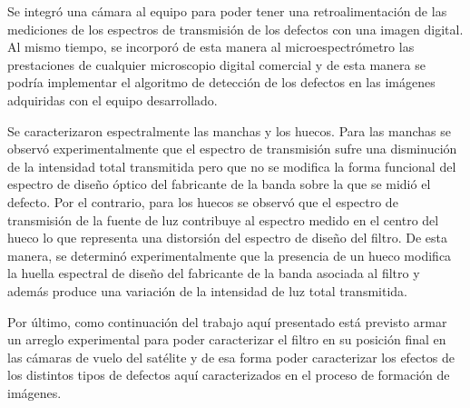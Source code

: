 Se integró una cámara al equipo para poder tener una retroalimentación de las mediciones de los espectros de transmisión de los defectos con una imagen digital. Al mismo tiempo, se incorporó de esta manera al microespectrómetro las prestaciones de cualquier microscopio digital comercial y de esta manera se podría implementar el algoritmo de detección de los defectos en las imágenes adquiridas con el equipo desarrollado.

Se caracterizaron espectralmente las manchas y los huecos. Para las manchas se observó experimentalmente que el espectro de transmisión sufre una disminución de la intensidad total transmitida pero que no se modifica la forma funcional del espectro de diseño óptico del fabricante de la banda sobre la que se midió el defecto. Por el contrario, para los huecos se observó que el espectro de transmisión de la fuente de luz contribuye al espectro medido en el centro del hueco lo que representa una distorsión del espectro de diseño del filtro. De esta manera, se determinó experimentalmente que la presencia de un hueco modifica la huella espectral de diseño del fabricante de la banda asociada al filtro y además produce una variación de la intensidad de luz total transmitida.

Por último, como continuación del trabajo aquí presentado está previsto armar un arreglo experimental para poder caracterizar el filtro en su posición final en las cámaras de vuelo del satélite y de esa forma poder caracterizar los efectos de los distintos tipos de defectos aquí caracterizados en el proceso de formación de imágenes.